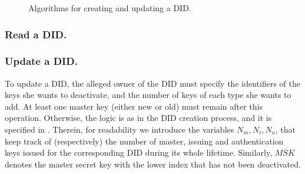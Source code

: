 \begin{figure}
\begin{pchstack}[center, boxed, space=5mm]
  \end{pchstack}
  \label{fig:cudid}
  \caption{Algorithms for creating and updating a DID.}
\end{figure}

\subsubsection{Read a DID.} 

\subsubsection{Update a DID.} %
To update a DID, the alleged owner of the DID must specify the identifiers of
the keys she wants to deactivate, and the number of keys of each type she wants
to add. At least one master key (either new or old) must remain after this
operation. Otherwise, the logic is as in the DID creation process, and it is
specified in . Therein, for readability we introduce the
variables $N_m,N_i,N_a$, that keep track of (respectively) the number of master,
issuing and authentication keys issued for the corresponding DID during its
whole lifetime. Similarly, $\overline{MSK}$ denotes the master secret key with
the lower index that has not been deactivated.

